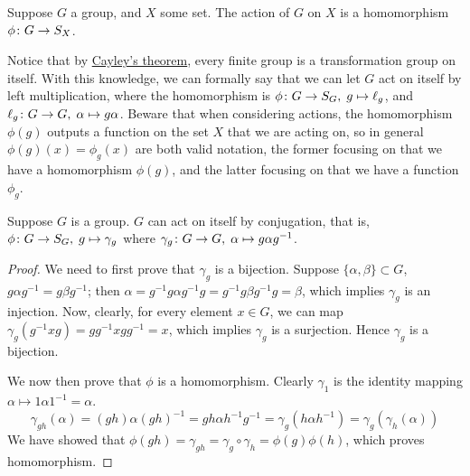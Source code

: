 \begin{definition}
    Suppose \(G\) a group, and \(X\) some set.
    The action of \(G\) on \(X\) is a homomorphism \(\phi\colon G\to S_X\).
\end{definition}
\begin{remark}
    Notice that by \hyperref[thm:cayley]{Cayley's theorem},
    every finite group is a transformation group on itself.
    With this knowledge,
    we can formally say that we can let \(G\) act on itself
    by left multiplication,
    where the homomorphism is \(\phi\colon G\to S_G,\;g\mapsto\ell_g\),
    and \(\ell_g\colon G\to G,\;\alpha\mapsto g\alpha\).
    Beware that when considering actions,
    the homomorphism \(\phi(g)\) outputs a function
    on the set \(X\) that we are acting on,
    so in general \(\phi(g)(x) = \phi_g(x)\) are both valid notation,
    the former focusing on that we have a homomorphism \(\phi(g)\),
    and the latter focusing on that we have a function \(\phi_g\).
\end{remark}

\begin{proposition}
    Suppose \(G\) is a group.
    \(G\) can act on itself by conjugation,
    that is, \(\phi\colon G\to S_G,\;g\mapsto\gamma_g\)
    where \(\gamma_g\colon G\to G,\;\alpha\mapsto g \alpha g^{-1}\).
\end{proposition}
\begin{proof}
    We need to first prove that \(\gamma_g\) is a bijection.
    Suppose \(\{\alpha,\beta\} \subset G\),
    \(g \alpha g^{-1} = g \beta g^{-1}\);
    then \(\alpha = g^{-1}g \alpha g^{-1}g
    = g^{-1}g \beta g^{-1}g = \beta\),
    which implies \(\gamma_g\) is an injection.
    Now, clearly, for every element \(x \in G\),
    we can map \(\gamma_g(g^{-1}xg) = gg^{-1}xgg^{-1} = x\),
    which implies \(\gamma_g\) is a surjection.
    Hence \(\gamma_g\) is a bijection.

    We now then prove that \(\phi\) is a homomorphism.
    Clearly \(\gamma_1\) is the identity mapping
    \(\alpha \mapsto 1\alpha 1^{-1} = \alpha\).
    \begin{equation*}
        \gamma_{gh}(\alpha) = (gh)\alpha{(gh)}^{-1}
        = g h\alpha h^{-1}g^{-1} = \gamma_g(h \alpha h^{-1})
        = \gamma_g(\gamma_h(\alpha))
    \end{equation*}
    We have showed that
    \(\phi(gh) = \gamma_{gh} = \gamma_g \circ \gamma_h = \phi(g)\phi(h)\),
    which proves homomorphism.
\end{proof}

